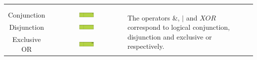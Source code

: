 \documentclass[]{article}
\begin{document}
\begin{landscape}
\begin{center}
\begin{tabular}[c]{|c|c|p{12cm}|}
 &&\\
&&\\ 
 \hline
 \multirow{3}{*}{Conjunction} & \multirow{3}{*}{\includegraphics[width=0.23\textwidth]{figs/AppendixB/Operators/Conjunction.pdf}} & \multirow{9}{12cm}{The operators \&, $|$ and $XOR$ correspond to logical conjunction, disjunction and exclusive or respectively.}\\
 &&\\
&&\\
 \cline{1-2}
 \multirow{3}{*}{Disjunction} & \multirow{3}{*}{\includegraphics[width=0.23\textwidth]{figs/AppendixB/Operators/Disjunction.pdf}} & \\
 &&\\
&&\\
 \cline{1-2}
 \multirow{3}{*}{Exclusive OR} & \multirow{3}{*}{\includegraphics[width=0.23\textwidth]{figs/AppendixB/Operators/XOR.pdf}} & \\
 &&\\
&&\\
 \hline
\end{tabular}
\end{center}
\onehalfspacing

\clearpage


\end{landscape}
\end{document}
